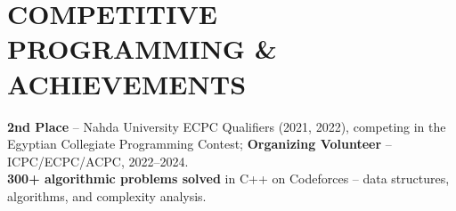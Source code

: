 \section*{COMPETITIVE PROGRAMMING \& ACHIEVEMENTS}
{\small \textbf{2nd Place} -- Nahda University ECPC Qualifiers (2021, 2022), competing in the Egyptian Collegiate Programming Contest; \textbf{Organizing Volunteer} -- ICPC/ECPC/ACPC, 2022--2024.\\[0.15em]
\textbf{300+ algorithmic problems solved} in C++ on Codeforces -- data structures, algorithms, and complexity analysis.}
